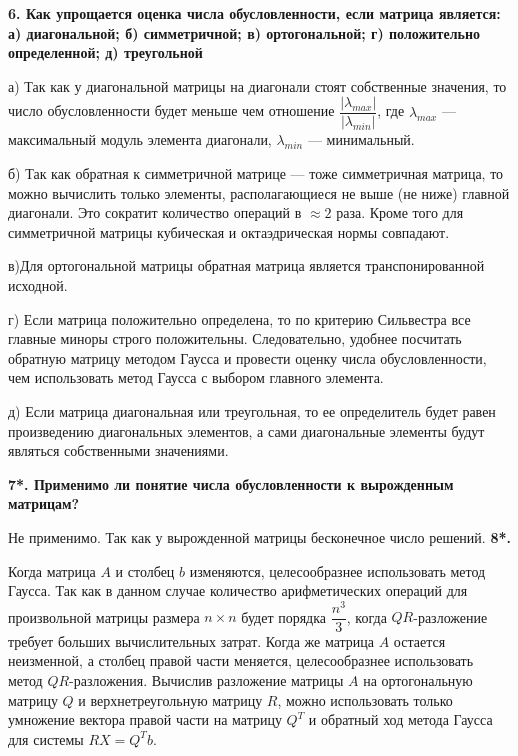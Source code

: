 \documentclass[12pt, a4paper]{article}
\begin{document}
\textbf{6. Как упрощается оценка числа обусловленности, если матрица является: а) диагональной; б) симметричной; в) ортогональной; г) положительно определенной; д) треугольной}

а) Так как у диагональной матрицы на диагонали стоят собственные значения, то число обусловленности будет меньше чем отношение $ \dfrac{ | \lambda_{max} |}{ | \lambda_{min} |}$, где $\lambda_{max}$ --- максимальный модуль элемента диагонали, $\lambda_{min}$ --- минимальный.

б) Так как обратная к симметричной матрице --- тоже симметричная матрица, то можно вычислить только элементы, располагающиеся не выше (не ниже) главной диагонали. Это сократит количество операций в $\approx 2$ раза. Кроме того для симметричной матрицы кубическая и октаэдрическая нормы совпадают.

в)Для ортогональной матрицы обратная матрица является транспонированной исходной.

г) Если матрица положительно определена, то по критерию Сильвестра все главные миноры строго положительны. Следовательно, удобнее посчитать обратную матрицу методом Гаусса и провести оценку числа обусловленности, чем использовать метод Гаусса с выбором главного элемента. 

д) Если матрица диагональная или треугольная, то ее определитель будет равен произведению диагональных элементов, а сами диагональные элементы будут являться собственными значениями.

\textbf{7*. Применимо ли понятие числа обусловленности к вырожденным матрицам? }


Не применимо. Так как у вырожденной матрицы бесконечное число решений. 
\textbf{8*.  }

Когда матрица $A$ и столбец $b$ изменяются, целесообразнее использовать метод Гаусса. Так как в данном случае количество арифметических операций для произвольной матрицы размера $n \times n $ будет порядка $ \dfrac{n^3}{3} $, когда $QR$-разложение требует больших вычислительных затрат.
{
Когда же матрица $A$ остается неизменной, а столбец правой части меняется, целесообразнее использовать метод  $QR$-разложения. Вычислив разложение матрицы $A$ на ортогональную матрицу $Q$ и верхнетреугольную матрицу $R$, можно использовать только умножение вектора правой части на матрицу $Q^T$ и обратный ход метода Гаусса для системы $RX=Q^Tb$.}
\end{document}
